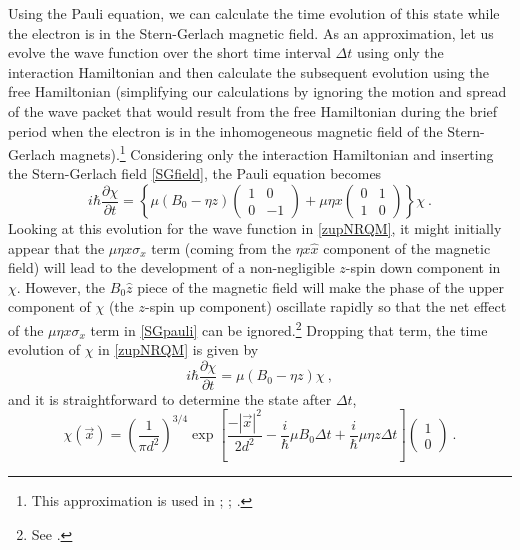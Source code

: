\documentclass[12pt,secnumarabic,amsmath,amssymb,balancelastpage,nofootinbib]{article}
\begin{document}
Using the Pauli equation, we can calculate the time evolution of this state while the electron is in the Stern-Gerlach magnetic field.  As an approximation, let us evolve the wave function over the short time interval $\Delta t$ using only the interaction Hamiltonian and then calculate the subsequent evolution using the free Hamiltonian (simplifying our calculations by ignoring the motion and spread of the wave packet that would result from the free Hamiltonian during the brief period when the electron is in the inhomogeneous magnetic field of the Stern-Gerlach magnets).\footnote{This approximation is used in \citet[example 4.4]{griffithsQM}; \citet[sec.\ 9.1]{ballentine}; \citet[sec.\ 1.7.1]{durr2020}.}  Considering only the interaction Hamiltonian and inserting the Stern-Gerlach field \eqref{SGfield}, the Pauli equation becomes
\begin{equation}
i \hbar \frac{\partial \chi}{\partial t} = \left\{ \mu(B_0-\eta z) \left(\begin{matrix} 1 & 0 \\ 0 & -1 \end{matrix}\right) + \mu \eta x \left(\begin{matrix} 0 & 1 \\  1 & 0 \end{matrix}\right)\right\}\chi
\ .
\label{SGpauli}
\end{equation}
Looking at this evolution for the wave function in \eqref{zupNRQM}, it might initially appear that the $\mu \eta x \sigma_x$ term (coming from the $\eta x \hat{x}$ component of the magnetic field) will lead to the development of a non-negligible $z$-spin down component in $\chi$.  However, the $B_0 \hat{z}$ piece of the magnetic field will make the phase of the upper component of $\chi$ (the $z$-spin up component) oscillate rapidly so that the net effect of the $\mu \eta x \sigma_x$ term in \eqref{SGpauli} can be ignored.\footnote{See \citet{platt1992}.}  Dropping that term, the time evolution of $\chi$ in \eqref{zupNRQM} is given by
\begin{equation}
i \hbar \frac{\partial \chi}{\partial t} = \mu(B_0-\eta z) \chi
\ ,
\end{equation}
and it is straightforward to determine the state after $\Delta t$,
\begin{equation}
\chi(\vec{x}) = \left(\frac{1}{\pi d^2}\right)^{3/4}  \exp\left[\frac{-|\vec{x}|^2}{2 d^2} - \frac{i}{\hbar}\mu B_0 \Delta t + \frac{i}{\hbar}\mu \eta z \Delta t\right] \left(\begin{matrix} 1\\0 \end{matrix}\right)
\ .
\label{zupNRQMafter}
\end{equation}
\end{document}
